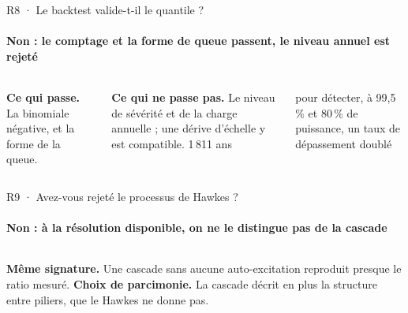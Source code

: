 \documentclass[aspectratio=169,10pt,t]{beamer}
\begin{document}
\begin{frame}[label=reserve-backtest]{R8 · Le backtest valide-t-il le quantile ?}
  \framesubtitle{Non : le comptage et la forme de queue passent, le niveau annuel est rejeté}
  \vspace{6mm}
  {\centering{}\par}
  \vspace{5mm}
  \begin{columns}[T,onlytextwidth]
    \footnotesize
    \textbf{Ce qui passe.} La binomiale négative, et la forme de la queue.\par\vspace{1mm}
    \textbf{Ce qui ne passe pas.} Le niveau de sévérité et de la charge annuelle ; une dérive d'échelle y est compatible.
    \centering
    {\editorial\fontsize{20}{22}\selectfont\color{accent}1\,811 ans}\par\vspace{1mm}
    {\scriptsize pour détecter, à 99,5\,\% et 80\,\% de puissance, un taux de dépassement doublé\par}
  \end{columns}
\end{frame}

\begin{frame}[label=reserve-hawkes]{R9 · Avez-vous rejeté le processus de Hawkes ?}
  \framesubtitle{Non : à la résolution disponible, on ne le distingue pas de la cascade}
  \vspace{6mm}
  {\centering{}\par}
  \vspace{5mm}
  \begin{columns}[T,onlytextwidth]
    \footnotesize
    \textbf{Même signature.} Une cascade sans aucune auto-excitation reproduit presque le ratio mesuré.
    \footnotesize
    \textbf{Choix de parcimonie.} La cascade décrit en plus la structure entre piliers, que le Hawkes ne donne pas.
  \end{columns}
\end{frame}
\end{document}
